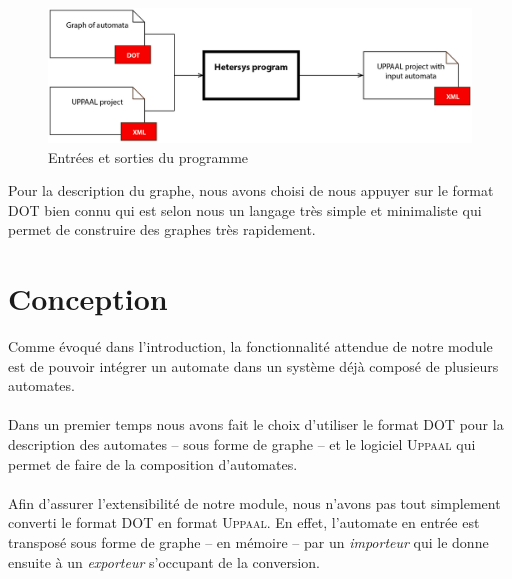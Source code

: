 \documentclass[12pt,a4paper]{report}
\begin{document}
\begin{figure}[h]
  \centering
  \includegraphics[scale=0.3]{ressources/ProgramScheme.png}
  \caption{Entrées et sorties du programme}
\end{figure}

Pour la description du graphe, nous avons choisi de nous appuyer
sur le format DOT bien connu qui est selon nous un langage très simple et minimaliste 
qui permet de construire des graphes très rapidement.

\section{Conception}

Comme évoqué dans l'introduction, la fonctionnalité attendue de notre module 
est de pouvoir intégrer un automate dans un système déjà composé de plusieurs
automates. 
\\\\
Dans un premier temps nous avons fait le choix d'utiliser le format DOT pour 
la description des automates -- sous forme de graphe -- et le logiciel \textsc{Uppaal}
qui permet de faire de la composition d'automates.
\\\\
Afin d'assurer l'extensibilité de notre module, nous n'avons pas tout simplement
converti le format DOT en format \textsc{Uppaal}. En effet, l'automate en entrée
est transposé sous forme de graphe -- en mémoire -- par un \emph{importeur} qui 
le donne ensuite à un \emph{exporteur} s'occupant de la conversion.
\end{document}
